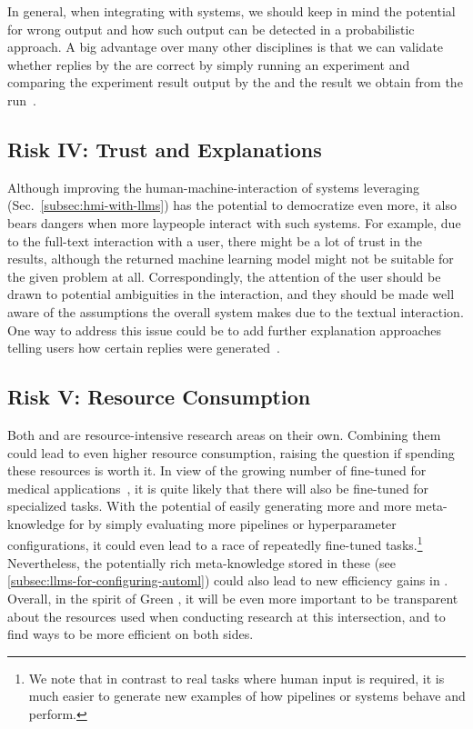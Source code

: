 \documentclass[10pt]{article} %
\begin{document}
In general, when integrating \LLMs with \AutoML systems, we should keep in mind the potential for wrong \LLM output and how such output can be detected in a probabilistic approach. A big advantage over many other disciplines is that we can validate whether replies by the \LLM are correct by simply running an experiment and comparing the experiment result output by the \LLM and the result we obtain from the run~\citep{zheng2023gpt4,chen2023evoprompting,hollmann2023gpt}.

\subsection{Risk IV: Trust and Explanations}
Although improving the human-machine-interaction of \AutoML systems leveraging \LLMs (Sec.~\ref{subsec:hmi-with-llms}) has the potential to democratize \ML even more, it also bears dangers when more laypeople interact with such systems. For example, due to the full-text interaction with a user, there might be a lot of trust in the results, although the returned machine learning model might not be suitable for the given problem at all. Correspondingly, the attention of the user should be drawn to potential ambiguities in the interaction, and they should be made well aware of the assumptions the overall system makes due to the textual interaction. One way to address this issue could be to add further explanation approaches telling users how certain replies were generated~\citep{deb-arxiv23a}. 

\subsection{Risk V: Resource Consumption} 
Both \LLMs and \AutoML are resource-intensive research areas on their own. Combining them could lead to even higher resource consumption, raising the question if spending these resources is worth it. In view of the growing number of fine-tuned \LLMs for medical applications~\citep{han-arxiv23a,wu-arxiv23b}, it is quite likely that there will also be fine-tuned \LLMs for specialized \AutoML tasks. With the potential of easily generating more and more meta-knowledge for \AutoML by simply evaluating more \ML pipelines or hyperparameter configurations, it could even lead to a race of repeatedly fine-tuned tasks.\footnote{We note that in contrast to real \NLP tasks where human input is required, it is much easier to generate new examples of how \ML pipelines or \AutoML systems behave and perform.} Nevertheless, the potentially rich meta-knowledge stored in these \LLMs (see \cref{subsec:llms-for-configuring-automl}) could also lead to new efficiency gains in \AutoML. Overall, in the spirit of Green \AutoML \citep{tornede-jair23a}, it will be even more important to be transparent about the resources used when conducting research at this intersection, and to find ways to be more efficient on both sides.
\end{document}
